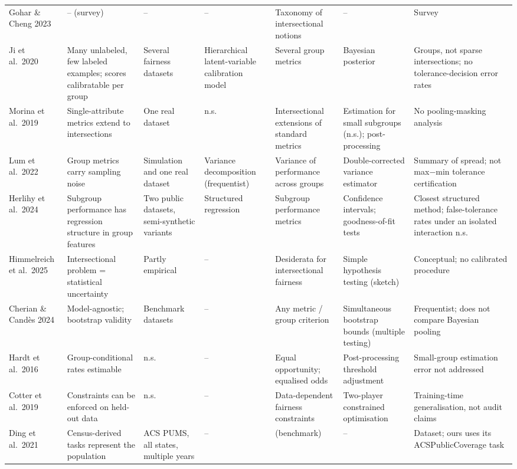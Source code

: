 \documentclass[10pt]{article}
\begin{document}
\begin{landscape}
\begin{longtable}{@{}L{2.9cm}L{3.2cm}L{2.5cm}L{3.3cm}L{2.8cm}L{2.9cm}L{3.6cm}@{}}
Gohar \& Cheng 2023~\cite{gohar2023} & -- (survey) & -- & -- & Taxonomy of intersectional notions & -- & Survey \\
Ji et al.\ 2020~\cite{ji2020} & Many unlabeled, few labeled examples; scores calibratable per group & Several fairness datasets & Hierarchical latent-variable calibration model & Several group metrics & Bayesian posterior & Groups, not sparse intersections; no tolerance-decision error rates \\
Morina et al.\ 2019~\cite{morina2019} & Single-attribute metrics extend to intersections & One real dataset & n.s. & Intersectional extensions of standard metrics & Estimation for small subgroups (n.s.); post-processing & No pooling-masking analysis \\
Lum et al.\ 2022~\cite{lum2022} & Group metrics carry sampling noise & Simulation and one real dataset & Variance decomposition (frequentist) & Variance of performance across groups & Double-corrected variance estimator & Summary of spread; not max$-$min tolerance certification \\
Herlihy et al.\ 2024~\cite{herlihy2024} & Subgroup performance has regression structure in group features & Two public datasets, semi-synthetic variants & Structured regression & Subgroup performance metrics & Confidence intervals; goodness-of-fit tests & Closest structured method; false-tolerance rates under an isolated interaction n.s. \\
Himmelreich et al.\ 2025~\cite{himmelreich2025} & Intersectional problem = statistical uncertainty & Partly empirical & -- & Desiderata for intersectional fairness & Simple hypothesis testing (sketch) & Conceptual; no calibrated procedure \\
Cherian \& Cand\`es 2024~\cite{cherian2024} & Model-agnostic; bootstrap validity & Benchmark datasets & -- & Any metric / group criterion & Simultaneous bootstrap bounds (multiple testing) & Frequentist; does not compare Bayesian pooling \\
Hardt et al.\ 2016~\cite{hardt2016} & Group-conditional rates estimable & n.s. & -- & Equal opportunity; equalised odds & Post-processing threshold adjustment & Small-group estimation error not addressed \\
Cotter et al.\ 2019~\cite{cotter2019} & Constraints can be enforced on held-out data & n.s. & -- & Data-dependent fairness constraints & Two-player constrained optimisation & Training-time generalisation, not audit claims \\
Ding et al.\ 2021~\cite{ding2021} & Census-derived tasks represent the population & ACS PUMS, all states, multiple years & -- & (benchmark) & -- & Dataset; ours uses its ACSPublicCoverage task \\

\end{longtable}
\end{landscape}
\end{document}

